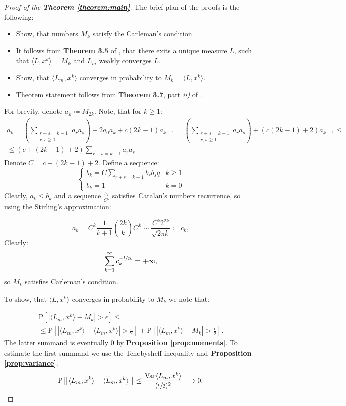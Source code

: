 \documentclass{article}
\newcommand{\prob}[1]{\mathrm{P}{\left[#1\right]}}
\newcommand{\Var}{\mathrm{Var}}
\begin{document}
\begin{proof}[Proof of the \textbf{Theorem \ref{theorem:main}}]
	The brief plan of the proofs is the following:
	\begin{itemize}
		\item Show, that numbers $M_k$ satisfy the Carleman's condition.
		
		\item It follows from \textbf{Theorem 3.5} of \cite{randmatrgeneral}, that there exits a unique measure $L$, such that $\langle L, x^k \rangle = M_k$ and $\overline{L}_m$ weakly converges $L$.
		
		\item Show, that $\langle L_m, x^k \rangle$ converges in probability to $M_k = \langle L, x^k \rangle$.
		
		\item Theorem statement follows from \textbf{Theorem 3.7}, part \emph{ii)} of \cite{randmatrgeneral}.
	\end{itemize}
	For brevity, denote $a_k \coloneqq M_{2k}$. Note, that for $k \geq 1$:
	\begin{multline}
		a_{k} = \left(\sum\limits_{\substack{r + s = k - 1 \\ r, s \geq 1}}a_ra_s\right) + 2a_0a_k + c(2k - 1)a_{k - 1} = \left(\sum\limits_{\substack{r + s = k - 1 \\ r, s \geq 1}}a_ra_s\right) + (c(2k - 1) + 2)a_{k - 1} \leq \\ \leq (c + (2k - 1) + 2) \sum\limits_{r + s = k - 1}a_ra_s
	\end{multline}
	Denote $C = c + (2k - 1) + 2$. Define a sequence:
	$$
	\begin{cases}
		b_k =  C \sum\limits_{r + s = k - 1}b_rb_s q & k \geq 1 \\
		b_k = 1 & k = 0
	\end{cases}
	$$
	Clearly, $a_k \leq b_k$ and a sequence $\frac{b_k}{C^k}$ satisfies Catalan's numbers recurrence, so using the Stirling's approximation:
	
	$$
	a_k = C^k\frac{1}{k + 1}\binom{2k}{k}C^k \sim \frac{C^k2^{2k}}{\sqrt{2\pi k}} \coloneq c_k,
	$$
	Clearly:
	$$
		\sum\limits_{k = 1}^{\infty}c_k^{-\sfrac{1}{2k}} = +\infty,
	$$
	so $M_k$ satisfies Carleman's condition.
	
	To show, that $\langle L, x^k\rangle$ converges in probability to $M_k$ we note that:
	
	\begin{multline*}
		\prob{|\langle L_m, x^k \rangle - M_k| > \epsilon} \leq  \\ \leq	\prob{\left|\langle L_m, x^k \rangle - \langle\overline{L}_m, x^k\rangle\right| > \frac{\epsilon}{2}} + \prob{\left|\langle\overline{L}_m, x^k\rangle - M_k\right| > \frac{\epsilon}{2}}.
	\end{multline*}
	The latter summand is eventually $0$ by \textbf{Proposition \ref{prop:moments}}. To estimate the first summand we use the Tchebysheff inequality and \textbf{Proposition \ref{prop:variance}}:
	$$
		\prob{\left|\langle L_m, x^k \rangle - \langle\overline{L}_m, x^k\rangle\right|} \leq \frac{\Var{\langle L_m, x^k \rangle}}{(\sfrac{\epsilon}{2})^2} \longrightarrow 0.
	$$
\end{proof}




\end{document}
